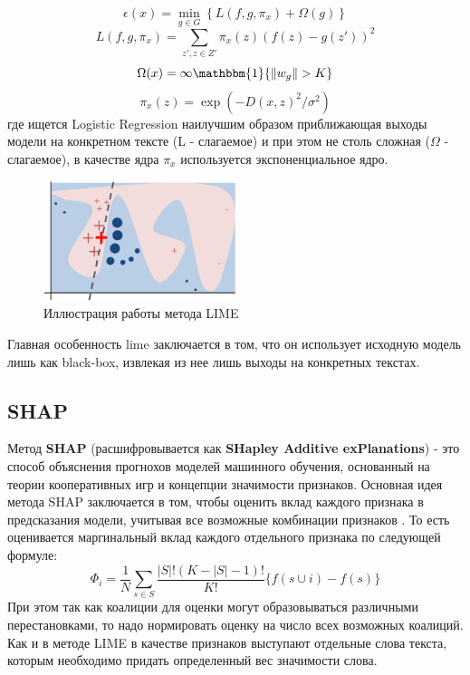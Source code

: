 \begin{equation*}
    \epsilon(x) = \min_{g \in G} \left\{ L(f, g, \pi_x) + \Omega(g) \right\}
\end{equation*}
\begin{equation*}
    L(f, g, \pi_x) = \sum_{z', z \in Z'} \pi_x(z)(f(z) - g(z'))^2
\end{equation*}
\begin{equation*}
    \Omega(x) = \infty\mathbbm{1}\{\|w_g\| > K\}
\end{equation*}
\begin{equation*}
    \pi_x(z) = \exp(-D(x, z)^2/\sigma^2)
\end{equation*}
где ищется Logistic Regression наилучшим образом приближающая выходы модели на конкретном тексте (L - слагаемое) и при этом не столь сложная ($\Omega$ - слагаемое), в качестве ядра $\pi_x$ используется экспоненциальное ядро.

\begin{figure}
    \centering
    \includegraphics[width=0.5\textwidth]{pictures/lime.png}
    \caption{Иллюстрация работы метода LIME}
    \label{fig:enter-label}
\end{figure}

\noindent\hspace{0.6cm}Главная особенность lime заключается в том, что он использует исходную модель лишь как black-box, извлекая из нее лишь выходы на конкретных текстах.

\subsection{SHAP}

\noindent\hspace{0.6cm}Метод \textbf{SHAP} (расшифровывается как \textbf{SHapley Additive exPlanations}) - это способ объяснения прогнохов моделей машинного обучения, основанный на теории кооперативных игр и концепции значимости признаков. Основная идея метода SHAP заключается в том, чтобы оценить вклад каждого признака в предсказания модели, учитывая все возможные комбинации признаков \cite{optimization1}. То есть оценивается маргинальный вклад каждого отдельного признака по следующей формуле:
\begin{equation*}
    \Phi_i = \frac{1}{N}\sum_{s \in S}\frac{|S|!(K - |S| - 1)!}{K!}\{f(s \cup i) - f(s)\}
\end{equation*}
\noindent\hspace{0.6cm}При этом так как коалиции для оценки могут образовываться различными перестановками, то надо нормировать оценку на число всех возможных коалиций. Как и в методе LIME в качестве признаков выступают отдельные слова текста, которым необходимо придать определенный вес значимости
слова.


